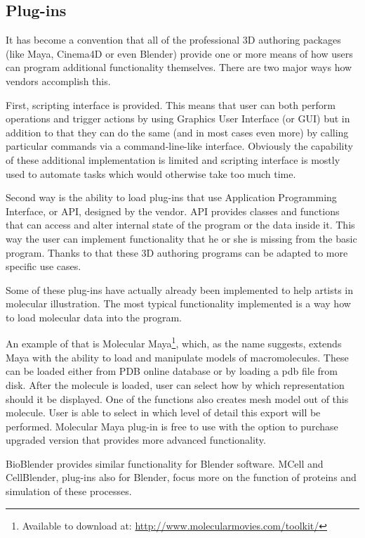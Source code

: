 \documentclass[
  digital, %
  table,   %
  nolof,     %
  nolot,     %
]{fithesis3}
\begin{document}
\subsection{Plug-ins}
It has become a convention that all of the professional 3D authoring packages (like Maya, Cinema4D or even Blender) provide one or more means of how users can program additional functionality themselves. There are two major ways how vendors accomplish this.

First, scripting interface is provided. This means that user can both perform operations and trigger actions by using Graphics User Interface (or GUI) but in addition to that they can do the same (and in most cases even more) by calling particular commands via a command-line-like interface. Obviously the capability of these additional implementation is limited and scripting interface is mostly used to automate tasks which would otherwise take too much time.

Second way is the ability to load plug-ins that use Application Programming Interface, or API, designed by the vendor. API provides classes and functions that can access and alter internal state of the program or the data inside it. This way the user can implement functionality that he or she is missing from the basic program. Thanks to that these 3D authoring programs can be adapted to more specific use cases.

Some of these plug-ins have actually already been implemented to help artists in molecular illustration. The most typical functionality implemented is a way how to load molecular data into the program.

An example of that is Molecular Maya\footnote{Available to download at: \url{http://www.molecularmovies.com/toolkit/}}, which, as the name suggests, extends Maya with the ability to load and manipulate models of macromolecules. These can be loaded either from PDB online database or by loading a pdb file from disk. After the molecule is loaded, user can select how by which representation should it be displayed. One of the functions also creates mesh model out of this molecule. User is able to select in which level of detail this export will be performed. Molecular Maya plug-in is free to use with the option to purchase upgraded version that provides more advanced functionality.

BioBlender provides similar functionality for Blender software. MCell and CellBlender\cite{mcell}, plug-ins also for Blender, focus more on the function of proteins and simulation of these processes.
\end{document}
